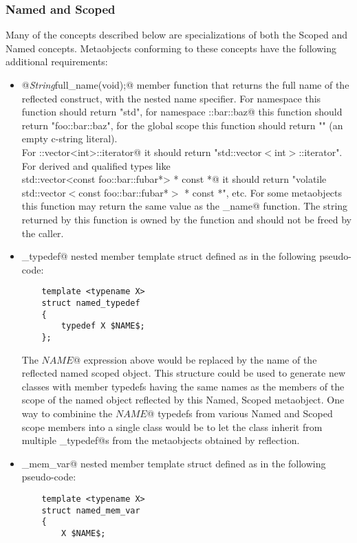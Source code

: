 \subsubsection{Named and Scoped}

Many of the concepts described below are specializations of both
the {\metaobject Scoped} and {\metaobject Named} concepts.
Metaobjects conforming to these concepts have the following additional
requirements:

\begin{itemize}
	\item{\verb@static @{\em String}\verb@ full_name(void);@} member function that returns the full name
	of the reflected construct, with the nested name specifier. For namespace
	\verb@std@ this function should return "std", for namespace \verb@foo::bar::baz@
	this function should return "foo::bar::baz", for the global scope this function
	should return "" (an empty c-string literal).\\For \verb@std::vector<int>::iterator@
	it should return "std::vector$<$int$>$::iterator". For derived and qualified types like\\
	\verb@volatile std::vector<const foo::bar::fubar*> * const *@ it should return
	"volatile std::vector$<$const foo::bar::fubar*$>$ * const *", etc. For some
	metaobjects this function may return the same value as the \verb@base_name@ function.
	The string returned by this function is owned by the function and should not be freed by the caller.

	\item{\verb@named_typedef@} nested member template struct defined as in
	the following pseudo-code:
	\begin{lstlisting}
	template <typename X>
	struct named_typedef
	{
		typedef X $NAME$;
	};
	\end{lstlisting}
	The \verb@$NAME$@ expression above would be replaced by the name of the reflected
	named scoped object. This structure could be used to generate new classes
	with member typedefs having the same names as the members of the scope of the named object
	reflected by this {\metaobject Named}, {\metaobject Scoped} metaobject.
	One way to combinine the \verb@$NAME$@ typedefs from various {\metaobject Named} and 
	{\metaobject Scoped} scope members into a single class would be to let the class inherit from
	multiple \verb@named_typedef@s from the metaobjects obtained by reflection.



	\item{\verb@named_mem_var@} nested member template struct defined as in
	the following pseudo-code:
	\begin{lstlisting}
	template <typename X>
	struct named_mem_var
	{
		X $NAME$;


\end{lstlisting}
\end{itemize}
